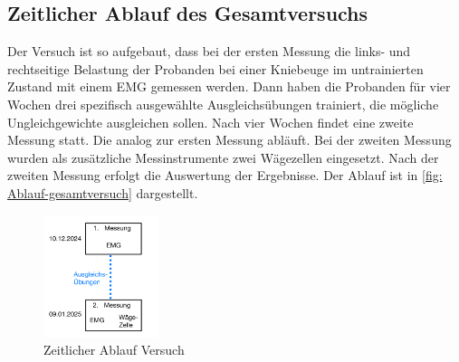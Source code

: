 \subsection{Zeitlicher Ablauf des Gesamtversuchs}
Der Versuch ist so aufgebaut, dass bei der ersten Messung die links- und rechtseitige Belastung der Probanden bei einer Kniebeuge im untrainierten Zustand mit einem EMG gemessen werden. 
Dann haben die Probanden für vier Wochen drei spezifisch ausgewählte Ausgleichsübungen trainiert, die mögliche Ungleichgewichte ausgleichen sollen. 
Nach vier Wochen findet eine zweite Messung statt. Die analog zur ersten Messung abläuft. Bei der zweiten Messung wurden als zusätzliche Messinstrumente zwei Wägezellen eingesetzt. 
Nach der zweiten Messung erfolgt die Auswertung der Ergebnisse. 
Der Ablauf ist in \autoref{fig: Ablauf-gesamtversuch} dargestellt. 
\begin{figure}[h!]
    \centering
    \includegraphics[width=0.3\textwidth]{img/Ablauf-gesamtversuch.jpeg}
    \caption{Zeitlicher Ablauf Versuch}
    \label{fig: Ablauf-gesamtversuch}
\end{figure}
\\
\\ 
